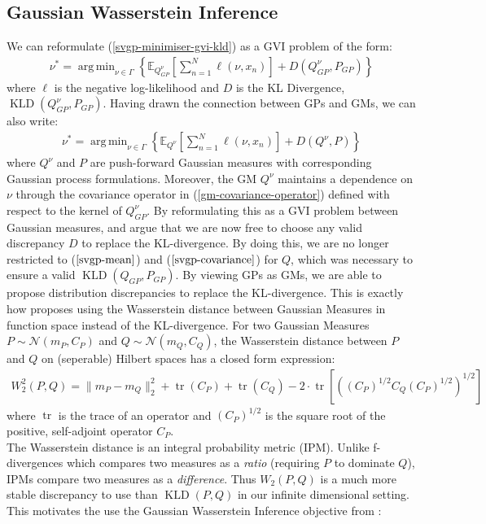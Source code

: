 \documentclass[twoside,11pt]{article}
\newcommand{\KLD}{\operatorname{KLD}}
\newcommand{\tr}{\operatorname{tr}}
\DeclareMathOperator*{\argmin}{arg\,min}
\begin{document}
\subsection{Gaussian Wasserstein Inference}
We can reformulate (\ref{svgp-minimiser-gvi-kld}) as a GVI problem of the form:
\begin{align}
    \label{svgp-gwi-gp}
    \nu^* = \argmin_{\nu \in \Gamma} \left\{ \mathbb{E}_{Q_{GP}^{\nu}}\left[\sum_{n=1}^N \ell(\nu, x_n)\right] + D(Q_{GP}^{\nu}, P_{GP})\right\}
\end{align}
where $\ell$ is the negative log-likelihood and $D$ is the KL Divergence, $\KLD(Q_{GP}^{\nu}, P_{GP})$. Having drawn the connection between GPs and GMs, we can also write:
\begin{align}
    \label{svgp-gwi-gm}
    \nu^* = \argmin_{\nu \in \Gamma} \left\{ \mathbb{E}_{Q^{\nu}}\left[\sum_{n=1}^N \ell(\nu, x_n)\right] + D(Q^{\nu}, P)\right\}
\end{align}
where $Q^{\nu}$ and $P$ are push-forward Gaussian measures with corresponding Gaussian process formulations. Moreover, the GM $Q^{\nu}$ maintains a dependence on $\nu$ through the covariance operator in (\ref{gm-covariance-operator}) defined with respect to the kernel of $Q_{GP}^{\nu}$. By reformulating this as a GVI problem between Gaussian measures, \cite{wild2022generalized} and \cite{knoblauch2022optimization} argue that we are now free to choose any valid discrepancy $D$ to replace the KL-divergence. By doing this, we are no longer restricted to ($\ref{svgp-mean}$) and ($\ref{svgp-covariance}$) for $Q$, which was necessary to ensure a valid $\KLD(Q_{GP},  P_{GP})$. By viewing GPs as GMs, we are able to propose distribution discrepancies to replace the KL-divergence. This is exactly how \cite{wild2022generalized} proposes using the Wasserstein distance between Gaussian Measures in function space instead of the KL-divergence. For two Gaussian Measures $P \sim \mathcal{N}(m_P, C_P)$ and $Q \sim \mathcal{N}(m_Q, C_Q)$, the Wasserstein distance between $P$ and $Q$ on (seperable) Hilbert spaces has a closed form expression:
\begin{align}
    \label{wasserstein-distance}
    W_2^2(P, Q) = \| m_P - m_Q\|_2^2 + \tr(C_P) + \tr(C_Q) - 2 \cdot \tr \left[ \left( \left(C_P\right)^{1/2} C_Q \left(C_P\right)^{1/2}\right)^{1/2}\right]
\end{align}
where $\tr$ is the trace of an operator and $\left(C_P\right)^{1/2}$ is the square root of the positive, self-adjoint operator $C_P$. 
\\The Wasserstein distance is an integral probability metric (IPM). Unlike f-divergences which compares two measures as a \textit{ratio} (requiring $P$ to dominate $Q$), IPMs compare two measures as a \textit{difference}. Thus $W_2(P, Q)$ is a much more stable discrepancy to use than $\KLD(P, Q)$ in our infinite dimensional setting. This motivates the use the Gaussian Wasserstein Inference objective from \cite{wild2022generalized}:
\end{document}
